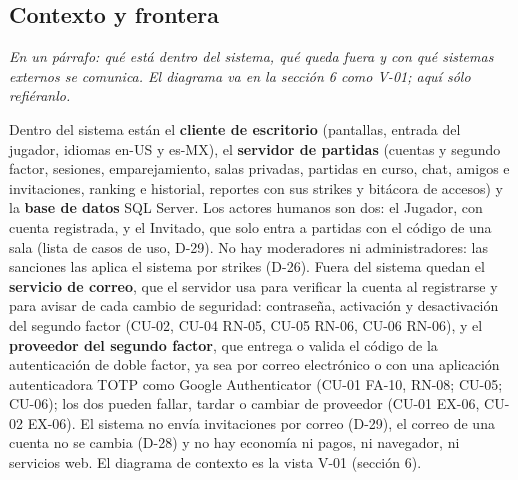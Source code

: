 \documentclass[11pt,letterpaper]{article}
\newcommand{\hint}[1]{{\itshape\color{black!70}#1}\par} %
\begin{document}
\subsection{Contexto y frontera}
\hint{En un párrafo: qué está dentro del sistema, qué queda fuera y con qué sistemas externos se comunica. El diagrama va en la sección 6 como V-01; aquí sólo refiéranlo.}
Dentro del sistema están el \textbf{cliente de escritorio} (pantallas, entrada del jugador, idiomas en-US y es-MX), el \textbf{servidor de partidas} (cuentas y segundo factor, sesiones, emparejamiento, salas privadas, partidas en curso, chat, amigos e invitaciones, ranking e historial, reportes con sus strikes y bitácora de accesos) y la \textbf{base de datos} SQL Server. Los actores humanos son dos: el Jugador, con cuenta registrada, y el Invitado, que solo entra a partidas con el código de una sala (lista de casos de uso, D-29). No hay moderadores ni administradores: las sanciones las aplica el sistema por strikes (D-26). Fuera del sistema quedan el \textbf{servicio de correo}, que el servidor usa para verificar la cuenta al registrarse y para avisar de cada cambio de seguridad: contraseña, activación y desactivación del segundo factor (CU-02, CU-04 RN-05, CU-05 RN-06, CU-06 RN-06), y el \textbf{proveedor del segundo factor}, que entrega o valida el código de la autenticación de doble factor, ya sea por correo electrónico o con una aplicación autenticadora TOTP como Google Authenticator (CU-01 FA-10, RN-08; CU-05; CU-06); los dos pueden fallar, tardar o cambiar de proveedor (CU-01 EX-06, CU-02 EX-06). El sistema no envía invitaciones por correo (D-29), el correo de una cuenta no se cambia (D-28) y no hay economía ni pagos, ni navegador, ni servicios web. El diagrama de contexto es la vista V-01 (sección 6).
\end{document}
